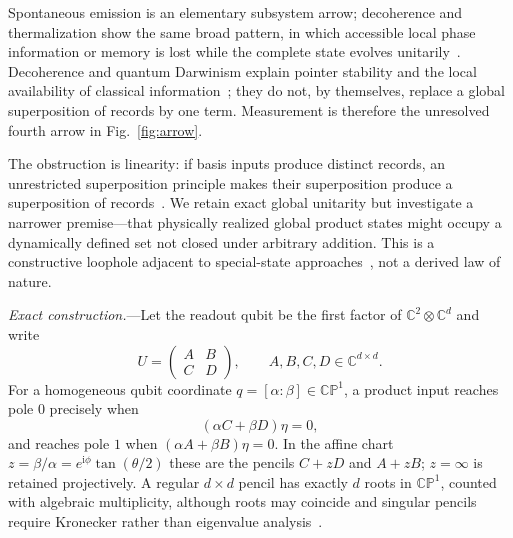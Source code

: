 \documentclass[aps,prl,reprint,superscriptaddress,nofootinbib]{revtex4-2}
\newcommand{\CP}{\mathbb{CP}}
\newcommand{\ii}{\mathrm{i}}
\begin{document}
Spontaneous emission is an elementary subsystem arrow; decoherence and thermalization show the same broad pattern, in which accessible local phase information or memory is lost while the complete state evolves unitarily~\cite{Zurek2003,Deutsch1991,Srednicki1994}.  Decoherence and quantum Darwinism explain pointer stability and the local availability of classical information~\cite{BrandaoPianiHorodecki2015,QiRanard2021,DoucetDeffner2024}; they do not, by themselves, replace a global superposition of records by one term.  Measurement is therefore the unresolved fourth arrow in Fig.~\ref{fig:arrow}.

The obstruction is linearity: if basis inputs produce distinct records, an unrestricted superposition principle makes their superposition produce a superposition of records~\cite{BassiGhirardi2000}.  We retain exact global unitarity but investigate a narrower premise---that physically realized global product states might occupy a dynamically defined set not closed under arbitrary addition.  This is a constructive loophole adjacent to special-state approaches~\cite{Schulman2012,Schulman2017}, not a derived law of nature.

\emph{Exact construction.}---Let the readout qubit be the first factor of $\mathbb C^2\otimes\mathbb C^d$ and write
\begin{equation}
 U=\begin{pmatrix}A&B\\C&D\end{pmatrix},\qquad A,B,C,D\in\mathbb C^{d\times d}.       \label{eq:block}
\end{equation}
For a homogeneous qubit coordinate $q=[\alpha:\beta]\in\CP^1$, a product input reaches pole $0$ precisely when
\begin{equation}
 (\alpha C+\beta D)\eta=0,                                                       \label{eq:pencil0}
\end{equation}
and reaches pole $1$ when $(\alpha A+\beta B)\eta=0$.  In the affine chart $z=\beta/\alpha=e^{\ii\phi}\tan(\theta/2)$ these are the pencils $C+zD$ and $A+zB$; $z=\infty$ is retained projectively.  A regular $d\times d$ pencil has exactly $d$ roots in $\CP^1$, counted with algebraic multiplicity, although roots may coincide and singular pencils require Kronecker rather than eigenvalue analysis~\cite{MolerStewart1973,Supplement}.
\end{document}
